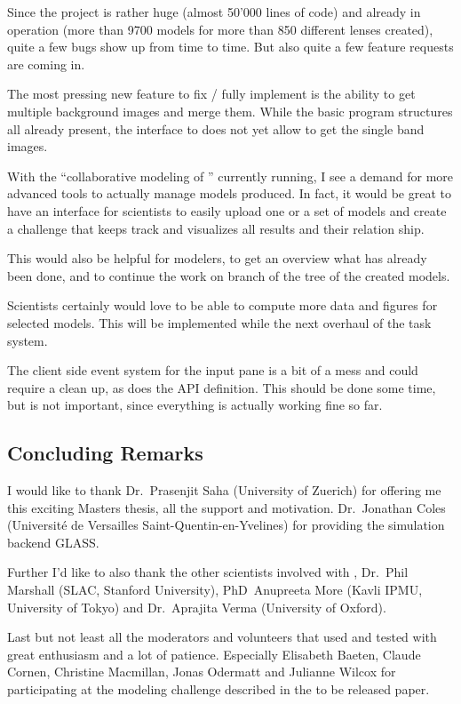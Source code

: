 Since the project is rather huge (almost 50'000 lines of code) and already in operation (more than 9700 models for more than 850 different lenses created), quite a few bugs show up from time to time.
But also quite a few feature requests are coming in.

The most pressing new feature to fix / fully implement is the ability to get multiple background images and merge them. While the basic program structures all already present, the interface to \sw does not yet allow to get the single band images.

With the ``collaborative modeling of '' currently running, I see a demand for more advanced tools to actually manage models produced. In fact, it would be great to have an interface for scientists to easily upload one or a set of models and create a challenge that keeps track and visualizes all results and their relation ship.

This would also be helpful for modelers, to get an overview what has already been done, and to continue the work on branch of the tree of the created models.

Scientists certainly would love to be able to compute more data and figures for selected models.
This will be implemented while the next overhaul of the task system.

The client side event system for the input pane is a bit of a mess and could require a clean up, as does the API definition.
This should be done some time, but is not important, since everything is actually working fine so far.


\subsection{Concluding Remarks}

I would like to thank Dr.~Prasenjit Saha (University of Zuerich) for offering me this exciting Masters thesis, all the support and motivation. Dr.~Jonathan Coles (Université de Versailles Saint-Quentin-en-Yvelines) for providing the simulation backend GLASS.

Further I'd like to also thank the other scientists involved with \sw, Dr.~Phil Marshall (SLAC, Stanford University), PhD~Anupreeta More (Kavli IPMU, University of Tokyo) and Dr.~Aprajita Verma (University of Oxford).

Last but not least all the \sw moderators and volunteers that used and tested \spl with great enthusiasm and a lot of patience. Especially Elisabeth Baeten, Claude Cornen, Christine Macmillan, Jonas Odermatt and Julianne Wilcox for participating at the modeling challenge described in the to be released paper.